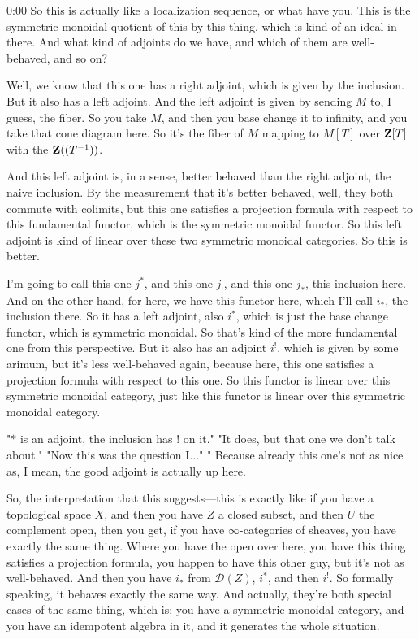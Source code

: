 \begin{unfinished}{0:00}
So this is actually like a localization sequence, or what have you. This is the symmetric monoidal quotient of this by this thing, which is kind of an ideal in there. And what kind of adjoints do we have, and which of them are well-behaved, and so on?

Well, we know that this one has a right adjoint, which is given by the inclusion. But it also has a left adjoint. And the left adjoint is given by sending $M$ to, I guess, the fiber. So you take $M$, and then you base change it to infinity, and you take that cone diagram here. So it's the fiber of $M$ mapping to $M[T]$ over $\mathbf Z[T]$ with the $\mathbf Z((T^{-1}))$.

And this left adjoint is, in a sense, better behaved than the right adjoint, the naive inclusion. By the measurement that it's better behaved, well, they both commute with colimits, but this one satisfies a projection formula with respect to this fundamental functor, which is the symmetric monoidal functor. So this left adjoint is kind of linear over these two symmetric monoidal categories. So this is better.

I'm going to call this one $j^*$, and this one $j_!$, and this one $j_*$, this inclusion here. And on the other hand, for here, we have this functor here, which I'll call $i_*$, the inclusion there. So it has a left adjoint, also $i^*$, which is just the base change functor, which is symmetric monoidal. So that's kind of the more fundamental one from this perspective. But it also has an adjoint $i^!$, which is given by some arimum, but it's less well-behaved again, because here, this one satisfies a projection formula with respect to this one. So this functor is linear over this symmetric monoidal category, just like this functor is linear over this symmetric monoidal category.

"$\ast$ is an adjoint, the inclusion has $!$ on it." 
"It does, but that one we don't talk about."
"Now this was the question I..."
" Because already this one's not as nice as, I mean, the good adjoint is actually up here.

So, the interpretation that this suggests---this is exactly like if you have a topological space $X$, and then you have $Z$ a closed subset, and then $U$ the complement open, then you get, if you have $\infty$-categories of sheaves, you have exactly the same thing. Where you have the open over here, you have this thing satisfies a projection formula, you happen to have this other guy, but it's not as well-behaved. And then you have $i_*$ from $\mathcal{D}(Z)$, $i^*$, and then $i^!$. So formally speaking, it behaves exactly the same way. And actually, they're both special cases of the same thing, which is: you have a symmetric monoidal category, and you have an idempotent algebra in it, and it generates the whole situation.


\end{unfinished}
